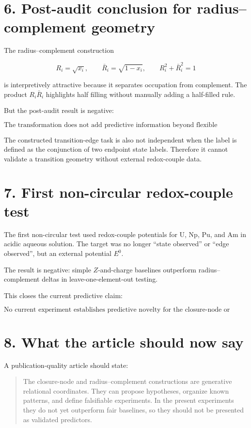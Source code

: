 \section{6. Post-audit conclusion for radius--complement
geometry}\label{post-audit-conclusion-for-radiuscomplement-geometry}

The radius--complement construction

\[
R_i=\sqrt{x_i},\qquad \bar R_i=\sqrt{1-x_i},\qquad R_i^2+\bar R_i^2=1
\]

is interpretively attractive because it separates occupation from
complement. The product \(R_i\bar R_i\) highlights half filling without
manually adding a half-filled rule.

But the post-audit result is negative:

\[
\boxed{\text{The transformation does not add predictive information beyond flexible polynomials in the same occupancies.}}
\]

The constructed transition-edge task is also not independent when the
label is defined as the conjunction of two endpoint state labels.
Therefore it cannot validate a transition geometry without external
redox-couple data.

\section{7. First non-circular redox-couple
test}\label{first-non-circular-redox-couple-test}

The first non-circular test used redox-couple potentials for U, Np, Pu,
and Am in acidic aqueous solution. The target was no longer ``state
observed'' or ``edge observed'', but an external potential \(E^0\).

The result is negative: simple \(Z\)-and-charge baselines outperform
radius--complement deltas in leave-one-element-out testing.

This closes the current predictive claim:

\[
\boxed{\text{No current experiment establishes predictive novelty for the closure-node or radius--complement descriptors.}}
\]

\section{8. What the article should now
say}\label{what-the-article-should-now-say}

A publication-quality article should state:

\begin{quote}
The closure-node and radius--complement constructions are generative
relational coordinates. They can propose hypotheses, organize known
patterns, and define falsifiable experiments. In the present experiments
they do not yet outperform fair baselines, so they should not be
presented as validated predictors.
\end{quote}

